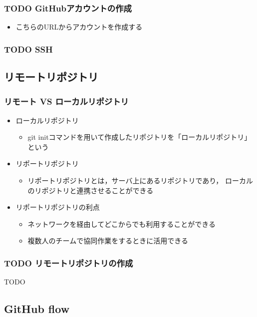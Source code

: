 \documentclass[a4paper,twoside,twocolumn]{bxjsarticle}
\begin{document}
\subsubsection{{\bfseries\sffamily TODO} GitHubアカウントの作成}
\label{sec-2-1-2}
\begin{itemize}
\item こちらのURLからアカウントを作成する
\end{itemize}

\subsubsection{{\bfseries\sffamily TODO} SSH}
\label{sec-2-1-3}

\subsection{リモートリポジトリ}
\label{sec-2-2}
\subsubsection{リモート VS ローカルリポジトリ}
\label{sec-2-2-1}
\begin{itemize}
\item ローカルリポジトリ
\begin{itemize}
\item git initコマンドを用いて作成したリポジトリを「ローカルリポジトリ」という
\end{itemize}
\item リポートリポジトリ
\begin{itemize}
\item リポートリポジトリとは，サーバ上にあるリポジトリであり，
ローカルのリポジトリと連携させることができる
\end{itemize}
\item リポートリポジトリの利点
\begin{itemize}
\item ネットワークを経由してどこからでも利用することができる
\item 複数人のチームで協同作業をするときに活用できる
\end{itemize}
\end{itemize}
\subsubsection{{\bfseries\sffamily TODO} リモートリポジトリの作成}
\label{sec-2-2-2}
TODO


\subsection{GitHub flow}
\label{sec-2-3}
\end{document}
